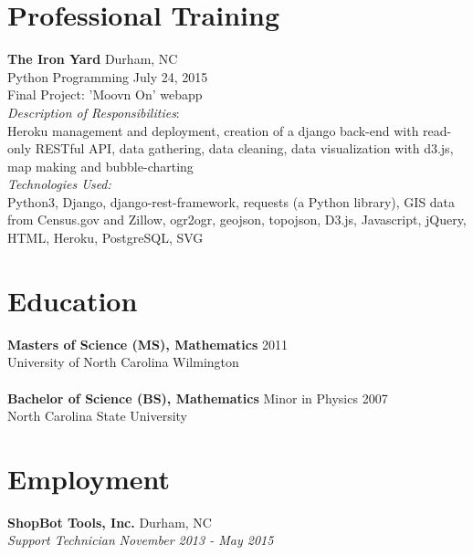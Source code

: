 \documentclass[10pt]{article}
\begin{document}

\section*{Professional Training}

{\bf The Iron Yard} \hfill Durham, NC\\
Python Programming \hfill {July 24, 2015}\\
Final Project: 'Moovn On' webapp\\
{\it Description of Responsibilities}:\\
Heroku management and deployment, creation of a django back-end with read-only RESTful API, data gathering, data cleaning, data visualization with d3.js, map making and bubble-charting\\
{\it Technologies Used:}\\
Python3, Django, django-rest-framework, requests (a Python library), GIS data from Census.gov and Zillow, ogr2ogr, geojson, topojson, D3.js, Javascript, jQuery, HTML, Heroku, PostgreSQL, SVG


\section*{Education}

{\bf Masters of Science (MS), Mathematics} \hfill 2011\\
University of North Carolina Wilmington\\
\\
{\bf Bachelor of Science (BS), Mathematics} Minor in Physics \hfill 2007\\
North Carolina State University


\section*{Employment}


\noindent
{\bf ShopBot Tools, Inc.} \hfill Durham, NC\\
{\it Support Technician} \hfill {\it November 2013 - May 2015}
\end{document}

